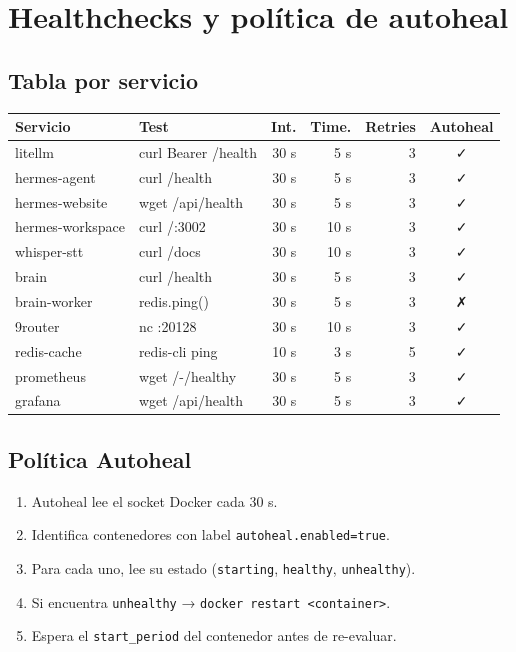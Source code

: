 \documentclass[11pt,a4paper]{article}
\begin{document}
\newpage

\section{Healthchecks y política de autoheal}

\subsection{Tabla por servicio}

\begin{center}
\begin{longtable}{|l|l|r|r|r|c|}
\hline
\rowcolor{hermesblue}\color{white}\textbf{Servicio} & \color{white}\textbf{Test} & \color{white}\textbf{Int.} & \color{white}\textbf{Time.} & \color{white}\textbf{Retries} & \color{white}\textbf{Autoheal}\\
\hline
\endhead
litellm & curl Bearer /health & 30 s & 5 s & 3 & ✓\\
hermes-agent & curl /health & 30 s & 5 s & 3 & ✓\\
hermes-website & wget /api/health & 30 s & 5 s & 3 & ✓\\
hermes-workspace & curl /:3002 & 30 s & 10 s & 3 & ✓\\
whisper-stt & curl /docs & 30 s & 10 s & 3 & ✓\\
brain & curl /health & 30 s & 5 s & 3 & ✓\\
brain-worker & redis.ping() & 30 s & 5 s & 3 & ✗\\
9router & nc :20128 & 30 s & 10 s & 3 & ✓\\
redis-cache & redis-cli ping & 10 s & 3 s & 5 & ✓\\
prometheus & wget /-/healthy & 30 s & 5 s & 3 & ✓\\
grafana & wget /api/health & 30 s & 5 s & 3 & ✓\\
\hline
\end{longtable}
\end{center}

\subsection{Política Autoheal}

\begin{enumerate}[leftmargin=*,itemsep=2pt]
\item Autoheal lee el socket Docker cada 30 s.
\item Identifica contenedores con label \texttt{autoheal.enabled=true}.
\item Para cada uno, lee su estado (\texttt{starting}, \texttt{healthy}, \texttt{unhealthy}).
\item Si encuentra \texttt{unhealthy} → \texttt{docker restart <container>}.
\item Espera el \texttt{start\_period} del contenedor antes de re-evaluar.
\end{enumerate}
\end{document}
